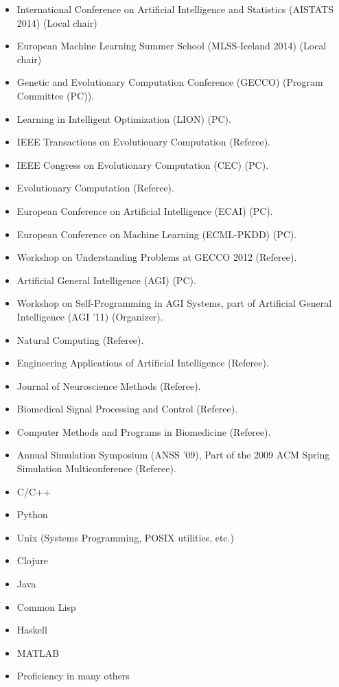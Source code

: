 \documentclass[a4paper,10pt]{cvclean}
\begin{document}
\begin{Professional Activities}
\begin{itemize}
\item International Conference on Artificial Intelligence and Statistics
  (AISTATS 2014) (Local chair)
\item European Machine Learning Summer School (MLSS-Iceland 2014) (Local chair)
\item Genetic and Evolutionary Computation Conference (GECCO) (Program Committee
  (PC)).
\item Learning in Intelligent Optimization (LION) (PC).
\item IEEE Transactions on Evolutionary Computation (Referee).
\item IEEE Congress on Evolutionary Computation (CEC) (PC).
\item Evolutionary Computation (Referee).
\item European Conference on Artificial Intelligence (ECAI) (PC).
\item European Conference on Machine Learning (ECML-PKDD) (PC).
\item Workshop on Understanding Problems at GECCO 2012 (Referee).
\item Artificial General Intelligence (AGI) (PC).
\item Workshop on Self-Programming in AGI Systems, part of Artificial
  General Intelligence (AGI '11) (Organizer).
\item Natural Computing (Referee).
\item Engineering Applications of Artificial Intelligence (Referee).
\item Journal of Neuroscience Methods (Referee).
\item Biomedical Signal Processing and Control (Referee).
\item Computer Methods and Programs in Biomedicine (Referee).
\item Annual Simulation Symposium (ANSS '09), Part of the 2009 ACM Spring
  Simulation Multiconference (Referee).
\end{itemize}
\end{Professional Activities}


\begin{Technical Skills}
\begin{itemize} 
\item C/C++
\item Python
\item Unix (Systems Programming, POSIX utilities, etc.)
\item Clojure
\item Java
\item Common Lisp
\item Haskell
\item MATLAB
\item Proficiency in many others
\end{itemize}
\end{Technical Skills}
\end{document}
